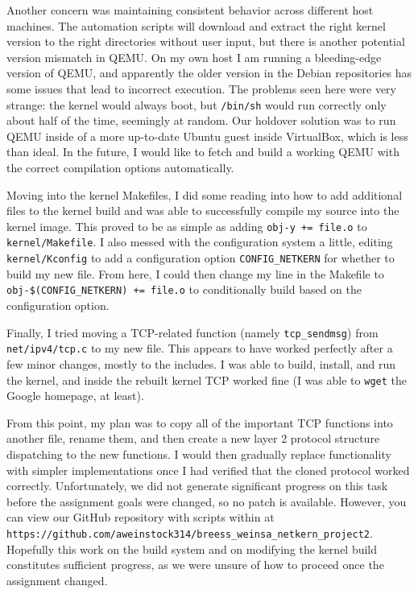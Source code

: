 \documentclass{article}
\begin{document}
Another concern was maintaining consistent behavior across different host machines.
The automation scripts will download and extract the right kernel version to the right directories without user input, but there is another potential version mismatch in QEMU\@.
On my own host I am running a bleeding-edge version of QEMU, and apparently the older version in the Debian repositories has some issues that lead to incorrect execution.
The problems seen here were very strange: the kernel would always boot, but \texttt{/bin/sh} would run correctly only about half of the time, seemingly at random.
Our holdover solution was to run QEMU inside of a more up-to-date Ubuntu guest inside VirtualBox, which is less than ideal.
In the future, I would like to fetch and build a working QEMU with the correct compilation options automatically.

Moving into the kernel Makefiles, I did some reading into how to add additional files to the kernel build and was able to successfully compile my source into the kernel image.
This proved to be as simple as adding \texttt{obj-y += file.o} to \texttt{kernel/Makefile}.
I also messed with the configuration system a little, editing \texttt{kernel/Kconfig} to add a configuration option \texttt{CONFIG\_NETKERN} for whether to build my new file.
From here, I could then change my line in the Makefile to \texttt{obj-\$(CONFIG\_NETKERN) += file.o} to conditionally build based on the configuration option.

Finally, I tried moving a TCP-related function (namely \texttt{tcp\_sendmsg}) from \texttt{net/ipv4/tcp.c} to my new file.
This appears to have worked perfectly after a few minor changes, mostly to the includes.
I was able to build, install, and run the kernel, and inside the rebuilt kernel TCP worked fine (I was able to \texttt{wget} the Google homepage, at least).

From this point, my plan was to copy all of the important TCP functions into another file, rename them, and then create a new layer 2 protocol structure dispatching to the new functions.
I would then gradually replace functionality with simpler implementations once I had verified that the cloned protocol worked correctly.
Unfortunately, we did not generate significant progress on this task before the assignment goals were changed, so no patch is available.
However, you can view our GitHub repository with scripts within at \texttt{https://github.com/aweinstock314/breess\_weinsa\_netkern\_project2}.
Hopefully this work on the build system and on modifying the kernel build constitutes sufficient progress, as we were unsure of how to proceed once the assignment changed.
\end{document}
